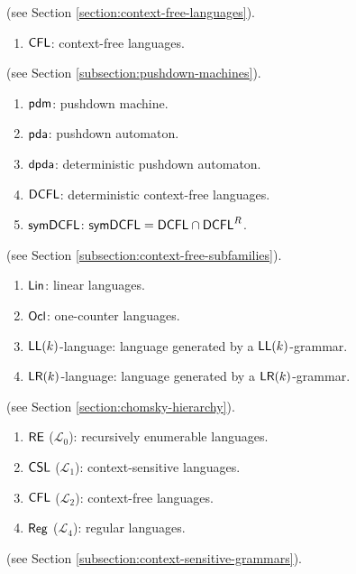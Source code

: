  (see Section \ref{section:context-free-languages}).

\begin{enumerate}[]
\item $\textup{\sf CFL}$: context-free languages.
\end{enumerate}

 (see Section \ref{subsection:pushdown-machines}).

\begin{enumerate}[]
\item $\textup{\sf pdm}$: pushdown machine.
\item $\textup{\sf pda}$: pushdown automaton.
\item $\textup{\sf dpda}$: deterministic pushdown automaton.
\item $\textup{\sf DCFL}$: deterministic context-free languages.
\item $\textup{\sf symDCFL}$: $\textup{\sf symDCFL} = \textup{\sf DCFL}\cap\textup{\sf DCFL}^R$.
\end{enumerate}


 (see Section \ref{subsection:context-free-subfamilies}).

\begin{enumerate}[]
\item $\textup{\sf Lin}$: linear languages.
\item $\textup{\sf Ocl}$: one-counter languages.
\item $\textup{\sf LL}(k)$-language: language generated by a $\textup{\sf LL}(k)$-grammar.
\item $\textup{\sf LR}(k)$-language: language generated by a $\textup{\sf LR}(k)$-grammar.
\end{enumerate}

 (see Section \ref{section:chomsky-hierarchy}).

\begin{enumerate}[]
\item $\textup{\sf RE}$ ($\mathcal{L}_0$): recursively enumerable languages.
\item $\textup{\sf CSL}$ ($\mathcal{L}_1$): context-sensitive languages.
\item $\textup{\sf CFL}$ ($\mathcal{L}_2$): context-free languages.
\item $\textup{\sf Reg}$ ($\mathcal{L}_4$): regular languages.
\end{enumerate}

 (see Section \ref{subsection:context-sensitive-grammars}).

